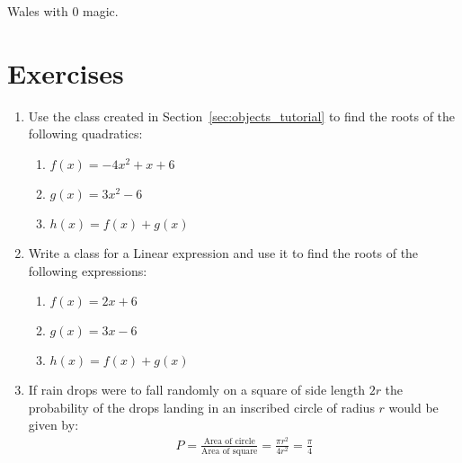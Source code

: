 \begin{raw}
Wales with 0 magic.
\end{raw}







\section{Exercises}

\begin{enumerate}

\item 

Use the class created in Section~\ref{sec:objects_tutorial} to find the roots of the
following quadratics:
\begin{enumerate}

\item 

\(f(x) = -4x ^ 2 + x + 6\)

\item 

\(g(x) = 3x ^ 2 - 6\)

\item 

\(h(x) = f(x) + g(x)\)

\end{enumerate}

\item 

Write a class for a Linear expression and use it to find the roots of the
following expressions:
\begin{enumerate}

\item 

\(f(x) = 2x + 6\)

\item 

\(g(x) = 3x - 6\)

\item 

\(h(x) = f(x) + g(x)\)

\end{enumerate}

\item 

If rain drops were to fall randomly on a square of side length \(2r\) the
probability of the drops landing in an inscribed circle of radius \(r\) would
be given by:
\begin{equation*}
\begin{split}
       P = \frac{\text{Area of circle}}{\text{Area of square}}=\frac{\pi r ^2}{4r^2}=\frac{\pi}{4}
   \end{split}
\end{equation*}


\end{enumerate}
